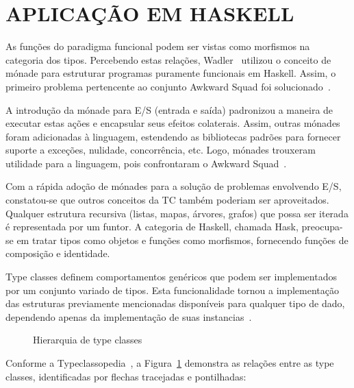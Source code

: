 \documentclass[10pt, conference]{IEEEtran}
\begin{document}
\bigskip

\section{APLICAÇÃO EM HASKELL}

As funções do paradigma funcional podem ser vistas como morfismos na categoria dos tipos. Percebendo estas relações, Wadler~\cite{peyton1993imperative, wadler1995monads, wadler1992comprehending, wadler1992essence} utilizou o conceito de mónade para estruturar programas puramente funcionais em Haskell. Assim, o primeiro problema pertencente ao conjunto Awkward Squad foi solucionado~\cite{jones2001tacklingthe}.

A introdução da mónade para E/S (entrada e saída) padronizou a maneira de executar  estas ações e encapsular seus efeitos colaterais. Assim, outras mónades foram adicionadas à linguagem, estendendo as bibliotecas padrões para fornecer suporte a exceções, nulidade, concorrência, etc. Logo, mónades trouxeram utilidade para a linguagem, pois confrontaram o Awkward Squad~\cite{jones2001tacklingthe}.

Com a rápida adoção de mónades para a solução de problemas envolvendo E/S, constatou-se que outros conceitos da TC também poderiam ser aproveitados. Qualquer estrutura recursiva (listas, mapas, árvores, grafos) que possa ser iterada é representada por um funtor. A categoria de Haskell, chamada Hask, preocupa-se em tratar tipos como objetos e funções como morfismos, fornecendo funções de composição e identidade.

Type classes definem comportamentos genéricos que podem ser implementados por um conjunto variado de tipos. Esta funcionalidade tornou a implementação das estruturas previamente mencionadas disponíveis para qualquer tipo de dado, dependendo apenas da implementação de suas instancias~\cite{o2008real}.

\begin{figure}[h]
\centering
	\scalebox{.85}{
		
	}
	\bigskip
	\caption[Typeclass Hierarchy]{Hierarquia de type classes}
	\label{fig:typeclassopedia}
\end{figure}

\addtocounter{footnote}{1}
	
Conforme a Typeclassopedia~\cite{web2015typeclassopedia}, a Figura~\ref{fig:typeclassopedia} demonstra as relações entre as type classes, identificadas por flechas tracejadas e pontilhadas:
\end{document}
